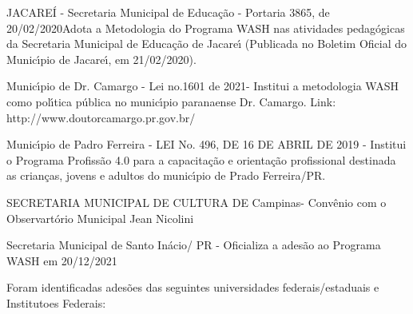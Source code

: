 \documentclass[
12pt,		%
openright,	%
twoside,  %
a4paper,			%
chapter=TITLE,		%
english,			%
french,				%
spanish,			%
brazil				%
]{USPSC-classe/USPSC}
\begin{document}
\begin{alineas}
\item JACARE\'I - Secretaria Municipal de Educa\c{c}\~ao - Portaria 3865, de 20/02/2020Adota a Metodologia do Programa WASH nas atividades pedag\'ogicas da Secretaria Municipal de Educa\c{c}\~ao de Jacare\'{\i} (Publicada no Boletim Oficial do Munic\'{\i}pio de Jacare\'{\i}, em 21/02/2020).
\item Munic\'{\i}pio de Dr. Camargo - Lei no.1601 de 2021- Institui a metodologia WASH como pol\'{\i}tica p\'ublica no munic\'{\i}pio paranaense Dr. Camargo. Link: http://www.doutorcamargo.pr.gov.br/
\item Munic\'{\i}pio de Padro Ferreira - LEI No. 496, DE 16 DE ABRIL DE 2019 - Institui o Programa Profiss\~ao 4.0 para a capacita\c{c}\~ao e orienta\c{c}\~ao profissional destinada as crian\c{c}as, jovens e adultos do munic\'{\i}pio de Prado Ferreira/PR.
\item SECRETARIA MUNICIPAL DE CULTURA DE Campinas- Conv\^enio com o Observart\'orio Municipal Jean Nicolini
\item Secretaria Municipal de Santo In\'acio/ PR - Oficializa a ades\~ao ao Programa WASH em  20/12/2021
\end{alineas}

Foram identificadas ades\~oes das seguintes universidades federais/estaduais e Institutoes Federais:
\end{document}
